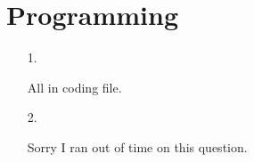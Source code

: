 \documentclass{article}
\begin{document}
\section{Programming}
\begin{enumerate}
    \item [1. ]
    
    \begin{enumerate}
        
        All in coding file.
        
    \end{enumerate}
    
    \item [2. ]
    
    Sorry I ran out of time on this question.
    
\end{enumerate}
\end{document}
